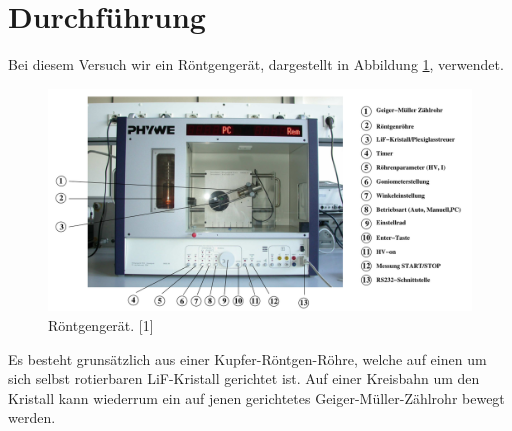 \section{Durchführung}
\label{sec:Durchführung}

Bei diesem Versuch wir ein Röntgengerät, dargestellt in Abbildung 
\ref{fig:Aufbau}, verwendet. 

\begin{figure}
\centering
\includegraphics[scale=0.5]{content/aufbau1.png}
\caption{Röntgengerät. [1]}
\label{fig:Aufbau}
\end{figure}

Es besteht grunsätzlich aus einer Kupfer-Röntgen-Röhre, welche auf einen 
um sich selbst rotierbaren LiF-Kristall gerichtet ist. Auf einer Kreisbahn 
um den Kristall kann wiederrum ein auf jenen gerichtetes Geiger-Müller-Zählrohr
bewegt werden.
